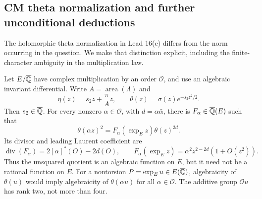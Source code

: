 \subsection{CM theta normalization and further unconditional deductions}

The holomorphic theta normalization in Lead 16(e) differs from the
norm occurring in the question. We make that distinction explicit,
including the finite-character ambiguity in the multiplication law.

\begin{statement}
Let $E/\overline{\mathbb Q}$ have complex multiplication by an order
$\mathcal O$, and use an algebraic invariant differential. Write
$A=\operatorname{area}(\Lambda)$ and
\[
 \eta(z)=s_2z+\frac{\pi}{A}\bar z,\qquad
 \theta(z)=\sigma(z)e^{-s_2z^2/2}.
\]
Then $s_2\in\overline{\mathbb Q}$. For every nonzero
$\alpha\in\mathcal O$, with $d=\alpha\bar\alpha$, there is
$F_\alpha\in\overline{\mathbb Q}(E)$ such that
\begin{equation}\label{eq:ct-CMmult}
 \theta(\alpha z)^2=F_\alpha(\exp_E z)\theta(z)^{2d}.
\end{equation}
Its divisor and leading Laurent coefficient are
\[
 \operatorname{div}(F_\alpha)=2[\alpha]^*(O)-2d(O),\qquad
 F_\alpha(\exp_Ez)=\alpha^2z^{2-2d}(1+O(z^2)).
\]
Thus the unsquared quotient is an algebraic function on $E$, but
it need not be a rational function on $E$. For a nontorsion
$P=\exp_Eu\in E(\overline{\mathbb Q})$, algebraicity of $\theta(u)$
would imply algebraicity of $\theta(\alpha u)$ for all
$\alpha\in\mathcal O$. The additive group $\mathcal O u$ has
rank two, not more than four.
\end{statement}
